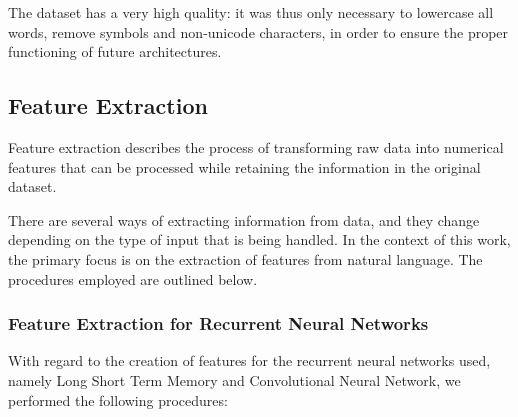 \documentclass[letterpaper,11pt]{article}
\begin{document}
The dataset has a very high quality: it was thus only necessary to lowercase all words, remove symbols and non-unicode characters, in order to ensure the proper functioning of future architectures.

\subsection{Feature Extraction}

Feature extraction describes the process of transforming raw data into numerical features that can be processed while retaining the information in the original dataset.

There are several ways of extracting information from data, and they change depending on the type of input that is being handled. In the context of this work, the primary focus is on the extraction of features from natural language. The procedures employed are outlined below.

\subsubsection*{Feature Extraction for Recurrent Neural Networks}

With regard to the creation of features for the recurrent neural networks used, namely Long Short Term Memory and Convolutional Neural Network, we performed the following procedures:
\end{document}
